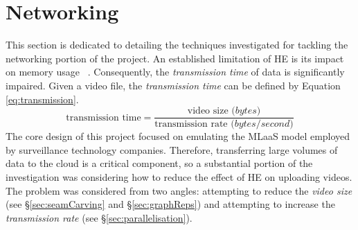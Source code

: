 \setlength{\leftskip}{0cm}



\section{Networking}
\setlength{\leftskip}{0.25cm}
\indent \indent
This section is dedicated to detailing the techniques investigated for tackling the networking portion of the project. An established limitation of HE is its impact on memory usage ~\cite{Makkaoui}. Consequently, the \textit{transmission time} of data is significantly impaired. Given a video file, the \textit{transmission time} can be defined by Equation \ref{eq:transmission}.
\begin{equation}
    \text{transmission time} = \frac{\text{video size }\textit{(bytes)}}{\text{transmission rate }\textit{(bytes/second)}}
    \label{eq:transmission}
\end{equation}
\indent \indent
The core design of this project focused on emulating the MLaaS model employed by surveillance technology companies. Therefore, transferring large volumes of data to the cloud is a critical component, so a substantial portion of the investigation was considering how to reduce the effect of HE on uploading videos. The problem was considered from two angles: attempting to reduce the \textit{video size} (see §\ref{sec:seamCarving} and §\ref{sec:graphReps}) and attempting to increase the \textit{transmission rate} (see §\ref{sec:parallelisation}).

\setlength{\leftskip}{0cm}
